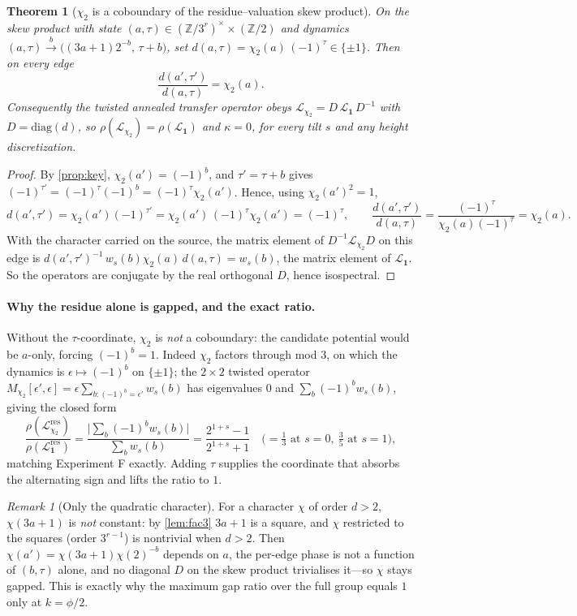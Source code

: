 \documentclass[11pt]{article}
\newcommand{\Z}{\mathbb{Z}}
\newcommand{\Lcal}{\mathcal{L}}
\theoremstyle{plain}
\newtheorem{theorem}{Theorem}
\theoremstyle{remark}
\newtheorem*{remark}{Remark}
\begin{document}
\begin{theorem}[$\chi_2$ is a coboundary of the residue--valuation skew product]
\label{thm:cobound}
On the skew product with state $(a,\tau)\in(\Z/3^r)^\times\times(\Z/2)$ and
dynamics $(a,\tau)\xrightarrow{b}\big((3a+1)2^{-b},\,\tau+b\big)$, set
$d(a,\tau)=\chi_2(a)\,(-1)^{\tau}\in\{\pm1\}$. Then on every edge
\[
\frac{d(a',\tau')}{d(a,\tau)}=\chi_2(a).
\]
Consequently the twisted annealed transfer operator obeys
$\Lcal_{\chi_2}=D\,\Lcal_{\mathbf 1}\,D^{-1}$ with $D=\mathrm{diag}(d)$, so
$\rho(\Lcal_{\chi_2})=\rho(\Lcal_{\mathbf 1})$ and $\kappa=0$, for every tilt $s$
and any height discretization.
\end{theorem}
\begin{proof}
By \cref{prop:key}, $\chi_2(a')=(-1)^b$, and $\tau'=\tau+b$ gives
$(-1)^{\tau'}=(-1)^\tau(-1)^b=(-1)^\tau\chi_2(a')$. Hence, using $\chi_2(a')^2=1$,
\[
d(a',\tau')=\chi_2(a')(-1)^{\tau'}=\chi_2(a')\,(-1)^\tau\chi_2(a')=(-1)^\tau,
\qquad
\frac{d(a',\tau')}{d(a,\tau)}=\frac{(-1)^\tau}{\chi_2(a)(-1)^\tau}=\chi_2(a).
\]
With the character carried on the source, the matrix element of $D^{-1}\Lcal_{\chi_2}D$
on this edge is $d(a',\tau')^{-1}\,w_s(b)\chi_2(a)\,d(a,\tau)=w_s(b)$, the matrix
element of $\Lcal_{\mathbf 1}$. So the operators are conjugate by the real
orthogonal $D$, hence isospectral.
\end{proof}

\paragraph{Why the residue alone is gapped, and the exact ratio.} Without the
$\tau$-coordinate, $\chi_2$ is \emph{not} a coboundary: the candidate potential
would be $a$-only, forcing $(-1)^b=1$. Indeed $\chi_2$ factors through mod $3$, on
which the dynamics is $\epsilon\mapsto(-1)^b$ on $\{\pm1\}$; the $2\times2$ twisted
operator $M_{\chi_2}[\epsilon',\epsilon]=\epsilon\sum_{b:(-1)^b=\epsilon'}w_s(b)$ has
eigenvalues $0$ and $\sum_b(-1)^b w_s(b)$, giving the closed form
\[
\frac{\rho(\Lcal^{\mathrm{res}}_{\chi_2})}{\rho(\Lcal^{\mathrm{res}}_{\mathbf 1})}
=\frac{\bigl|\sum_b(-1)^b w_s(b)\bigr|}{\sum_b w_s(b)}
=\frac{2^{1+s}-1}{2^{1+s}+1}
\quad\Big(=\tfrac13\text{ at }s{=}0,\ \tfrac35\text{ at }s{=}1\Big),
\]
matching Experiment F exactly. Adding $\tau$ supplies the coordinate that absorbs
the alternating sign and lifts the ratio to $1$.

\begin{remark}[Only the quadratic character]
For a character $\chi$ of order $d>2$, $\chi(3a+1)$ is \emph{not} constant: by
\cref{lem:fac3} $3a+1$ is a square, and $\chi$ restricted to the squares (order
$3^{r-1}$) is nontrivial when $d>2$. Then $\chi(a')=\chi(3a+1)\chi(2)^{-b}$ depends
on $a$, the per-edge phase is not a function of $(b,\tau)$ alone, and no diagonal
$D$ on the skew product trivialises it---so $\chi$ stays gapped. This is exactly
why the maximum gap ratio over the full group equals $1$ only at $k=\phi/2$.
\end{remark}
\end{document}
